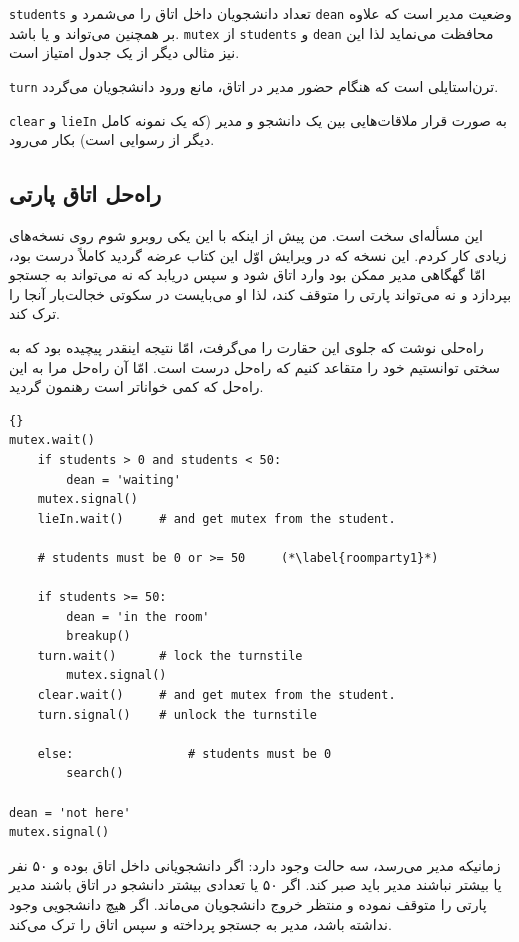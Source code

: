 \documentclass{book}
\newcommand{\clearemptydoublepage}{}%
\begin{document}
    {\tt students}
    تعداد دانشجویان داخل اتاق را می‌شمرد و {\tt dean}  وضعیت مدیر است که علاوه بر  
    همچنین می‌تواند  و یا  باشد. 
    {\tt mutex}
    از  {\tt students} و {\tt dean} محافظت می‌نماید لذا این نیز مثالی دیگر از یک جدول امتیاز است. 
    

    {\tt turn}
    ترن‌استایلی است که هنگام حضور مدیر در اتاق، مانع ورود دانشجویان می‌گردد. 

    {\tt clear} و {\tt lieIn}
    به صورت قرار ملاقات‌هایی بین  یک دانشجو و مدیر (که یک نمونه کامل دیگر از رسوایی است)  بکار می‌رود. 


\clearemptydoublepage
\subsection{راه‌حل اتاق پارتی}

    این مسأله‌ای  سخت است. من پیش از اینکه با این یکی روبرو شوم روی نسخه‌های زیادی کار کردم. این نسخه که در ویرایش اوّل این کتاب عرضه گردید 
    کاملاً درست بود، امّا گهگاهی مدیر ممکن بود وارد اتاق شود و سپس دریابد که نه می‌تواند به جستجو بپردازد و نه می‌تواند پارتی را متوقف کند، لذا او می‌بایست 
    در سکوتی خجالت‌بار آنجا را ترک کند. 

    راه‌حلی نوشت که جلوی این حقارت را می‌گرفت، امّا نتیجه اینقدر پیچیده بود که به سختی توانستیم خود را متقاعد کنیم که راه‌حل درست است. 
    امّا آن راه‌حل مرا به این راه‌حل که کمی خواناتر است رهنمون گردید. 


\begin{latin}
\begin{lstlisting}[title=\rl{راه‌حل اتاق پارتی (مدیر)}]{}
mutex.wait()
    if students > 0 and students < 50:
        dean = 'waiting'
	mutex.signal()
	lieIn.wait()     # and get mutex from the student.

    # students must be 0 or >= 50     (*\label{roomparty1}*)

    if students >= 50:
        dean = 'in the room'
        breakup()
	turn.wait()      # lock the turnstile
        mutex.signal()
	clear.wait()     # and get mutex from the student.
	turn.signal()    # unlock the turnstile

    else:                # students must be 0
        search()

dean = 'not here'
mutex.signal() 
\end{lstlisting}
\end{latin}

    زمانیکه مدیر می‌رسد، سه حالت وجود دارد: 
    اگر دانشجویانی داخل اتاق بوده و ۵۰ نفر یا بیشتر  نباشند مدیر باید صبر کند. اگر ۵۰ یا تعدادی بیشتر دانشجو در اتاق باشند مدیر پارتی را متوقف نموده و 
    منتظر خروج دانشجویان می‌ماند. اگر هیچ دانشجویی وجود نداشته باشد، مدیر به جستجو پرداخته و سپس اتاق را ترک می‌کند. 
    
\end{document}
